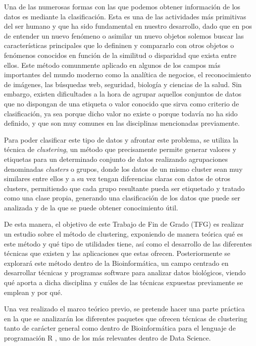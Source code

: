 \documentclass[10pt, a4paper]{article}
\begin{document}
Una de las numerosas formas con las que podemos obtener información de los datos es mediante la clasificación. Esta es una de las actividades más primitivas del ser humano y que ha sido fundamental en nuestro desarrollo, dado que en pos de entender un nuevo fenómeno o asimilar un nuevo objetos solemos buscar las características principales que lo defininen y compararlo con otros objetos o fenómenos conocidos en función de la similitud o disparidad que exista entre ellos. Este método comunmente aplicado en algunos de los campos más importantes del mundo moderno como la analítica de negocios, el reconocimiento de imágenes, las búsquedas web, seguridad, biología y ciencias de la salud. Sin embargo, existen dificultades a la hora de agrupar aquellos conjuntos de datos que no dispongan de una etiqueta o valor conocido que sirva como criterio de clasificación, ya sea porque dicho valor no existe o porque todavía no ha sido definido, y que son muy comunes en las disciplinas mencionadas previamente. 

Para poder clasificar este tipo de datos y afrontar este problema, se utiliza la técnica de \textit{clustering}, un método que precisamente permite generar valores y etiquetas para un determinado conjunto de datos realizando agrupaciones denominadas \textit{clusters} o grupos, donde los datos de un mismo cluster sean muy similares entre ellos y a su vez tengan diferencias claras con datos de otros clusters, permitiendo que cada grupo resultante pueda ser etiquetado y tratado como una clase propia, generando una clasificación de los datos que puede ser analizada y de la que se puede obtener conocimiento útil.

De esta manera, el objetivo de este Trabajo de Fin de Grado (TFG) es realizar un estudio sobre el método de clustering, exponiendo de manera teórica qué es este método y qué tipo de utilidades tiene, así como el desarrollo de las diferentes técnicas que existen y las aplicaciones que estas ofrecen. Posteriormente se explorará este método dentro de la Bioinformática, un campo centrado en desarrollar técnicas y programas software para analizar datos biológicos, viendo qué aporta a dicha disciplina y cuáles de las técnicas expuestas previamente se emplean y por qué. 

Una vez realizado el marco teórico previo, se pretende hacer una parte práctica en la que se analizarán los diferentes paquetes que ofrecen técnicas de clustering tanto de carácter general como dentro de Bioinformática para el lenguaje de programación R \cite{6}, uno de los más relevantes dentro de Data Science.
\end{document}
